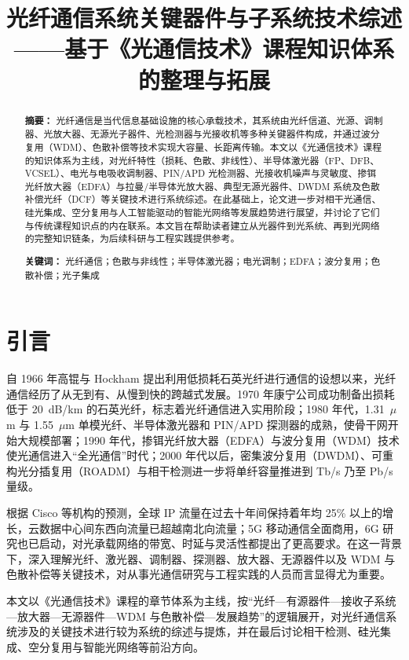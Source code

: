 \documentclass[a4paper,11pt,UTF8,fontset=fandol]{ctexart}
\title{\bfseries 光纤通信系统关键器件与子系统技术综述\\
\large ——基于《光通信技术》课程知识体系的整理与拓展}
\author{}
\date{}
\begin{document}
\maketitle

\begin{abstract}
\noindent\textbf{摘要：} 光纤通信是当代信息基础设施的核心承载技术，其系统由光纤信道、光源、调制器、光放大器、无源光子器件、光检测器与光接收机等多种关键器件构成，并通过波分复用（WDM）、色散补偿等技术实现大容量、长距离传输。本文以《光通信技术》课程的知识体系为主线，对光纤特性（损耗、色散、非线性）、半导体激光器（FP、DFB、VCSEL）、电光与电吸收调制器、PIN/APD 光检测器、光接收机噪声与灵敏度、掺铒光纤放大器（EDFA）与拉曼/半导体光放大器、典型无源光器件、DWDM 系统及色散补偿光纤（DCF）等关键技术进行系统综述。在此基础上，论文进一步对相干光通信、硅光集成、空分复用与人工智能驱动的智能光网络等发展趋势进行展望，并讨论了它们与传统课程知识点的内在联系。本文旨在帮助读者建立从光器件到光系统、再到光网络的完整知识链条，为后续科研与工程实践提供参考。

\vspace{4pt}
\noindent\textbf{关键词：} 光纤通信；色散与非线性；半导体激光器；电光调制；EDFA；波分复用；色散补偿；光子集成
\end{abstract}

\section{引言}

自 1966 年高锟与 Hockham 提出利用低损耗石英光纤进行通信的设想以来，光纤通信经历了从无到有、从慢到快的跨越式发展\cite{kao1966}。1970 年康宁公司成功制备出损耗低于 20~dB/km 的石英光纤，标志着光纤通信进入实用阶段；1980 年代，1.31~$\mu$m 与 1.55~$\mu$m 单模光纤、半导体激光器和 PIN/APD 探测器的成熟，使骨干网开始大规模部署；1990 年代，掺铒光纤放大器（EDFA）与波分复用（WDM）技术使光通信进入“全光通信”时代；2000 年代以后，密集波分复用（DWDM）、可重构光分插复用（ROADM）与相干检测进一步将单纤容量推进到 Tb/s 乃至 Pb/s 量级\cite{agrawal2010,kikuchi2016}。

根据 Cisco 等机构的预测，全球 IP 流量在过去十年间保持着年均 25\% 以上的增长，云数据中心间东西向流量已超越南北向流量；5G 移动通信全面商用，6G 研究也已启动，对光承载网络的带宽、时延与灵活性都提出了更高要求\cite{winzer2018}。在这一背景下，深入理解光纤、激光器、调制器、探测器、放大器、无源器件以及 WDM 与色散补偿等关键技术，对从事光通信研究与工程实践的人员而言显得尤为重要。

本文以《光通信技术》课程的章节体系为主线，按“光纤—有源器件—接收子系统—放大器—无源器件—WDM 与色散补偿—发展趋势”的逻辑展开，对光纤通信系统涉及的关键技术进行较为系统的综述与提炼，并在最后讨论相干检测、硅光集成、空分复用与智能光网络等前沿方向。
\end{document}
